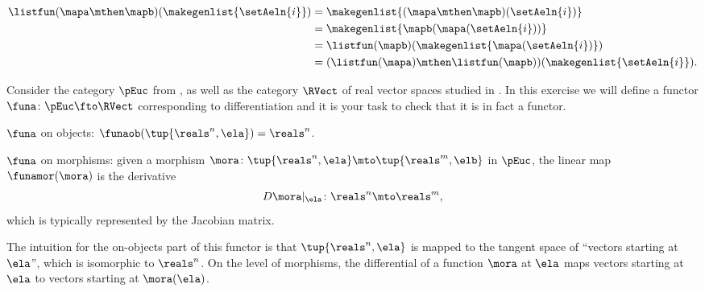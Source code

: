\begin{example}
    \begin{equation}\label{eq:list-functor-compositionality}
        \begin{aligned}
            \listfun(\mapa \mthen \mapb)(\makegenlist{\setAeln{i}}) & =\makegenlist{ (\mapa \mthen \mapb)(\setAeln{i})} \\
                                                                    & =\makegenlist{  \mapb ( \mapa (\setAeln{i}))} \\
                                                                    & =\listfun(\mapb)(\makegenlist{\mapa(\setAeln{i})}) \\
                                                                    & =(\listfun(\mapa)\mthen \listfun(\mapb))(\makegenlist{\setAeln{i}}).
        \end{aligned}
    \end{equation}
\end{example}

\begin{gradedexercise}
    \label{ex:DifferentiationFunctor}

    Consider the category $\pEuc$ from , as well as the category $\RVect$ of real vector spaces studied in .
    In this exercise we will define a functor $\funa \colon \pEuc \fto \RVect$ corresponding to differentiation and it is your task to check that it is in fact a functor.

    $\funa$ on objects: $\funaob (\tup{\reals^n, \ela}) = \reals^n$.

    $\funa$ on morphisms: given a morphism $\mora \colon \tup{\reals^n, \ela} \mto \tup{\reals^m, \elb}$ in $\pEuc$, the linear map $\funamor(\mora)$ is the derivative
    \begin{equation}
        D \mora \vert_\ela \colon \reals^n \mto \reals^m,
    \end{equation}
    which is typically represented by the Jacobian matrix.

    The intuition for the on-objects part of this functor is that $\tup{\reals^n, \ela}$ is mapped to the tangent space of ``vectors starting at $\ela$'', which is isomorphic to $\reals^n$.
    On the level of morphisms, the differential of a function $\mora$ at $\ela$ maps vectors starting at $\ela$ to vectors starting at $\mora(\ela)$.

\end{gradedexercise}


